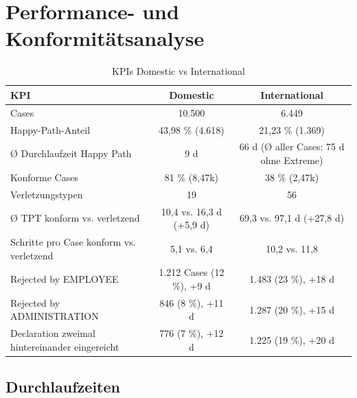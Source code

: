 \section{Performance- und Konformitätsanalyse}
\label{sec:performance}



\begin{table}[htbp]
\centering
\caption{KPIs Domestic vs International}
\label{tab:kpi_comparison}
\begin{tabular*}{\textwidth}{@{\extracolsep{\fill}} l c c @{}}
\hline
\textbf{KPI} & \textbf{Domestic} & \textbf{International} \\ \hline
Cases & 10.500 & 6.449 \\
Happy-Path-Anteil & 43,98 \% (4.618) & 21,23 \% (1.369) \\
Ø Durchlaufzeit Happy Path & 9 d & 66 d (Ø aller Cases: 75 d ohne Extreme) \\
Konforme Cases & 81 \% (8,47k) & 38 \% (2,47k) \\
Verletzungstypen & 19 & 56 \\
Ø TPT konform vs. verletzend & 10,4 vs. 16,3 d (+5,9 d) & 69,3 vs. 97,1 d (+27,8 d) \\
Schritte pro Case konform vs. verletzend & 5,1 vs. 6,4 & 10,2 vs. 11,8 \\
Rejected by EMPLOYEE & 1.212 Cases (12 \%), +9 d & 1.483 (23 \%), +18 d \\
Rejected by ADMINISTRATION & 846 (8 \%), +11 d & 1.287 (20 \%), +15 d \\
Declaration zweimal hintereinander eingereicht & 776 (7 \%), +12 d & 1.225 (19 \%), +20 d \\ \hline
\end{tabular*}
\end{table}

\subsection{Durchlaufzeiten}
\label{sec:durchlaufzeiten}

